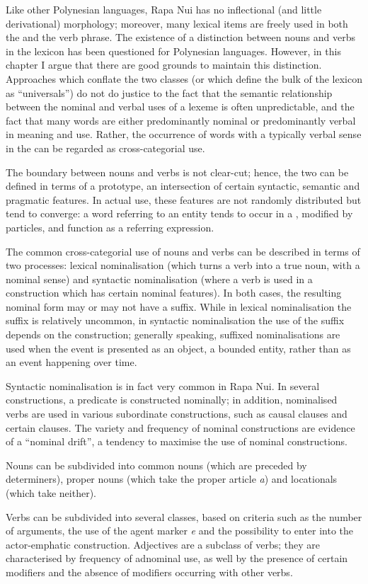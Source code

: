 Like other Polynesian languages, Rapa Nui has no inflectional (and little derivational) morphology; moreover, many lexical items are freely used in both the  and the verb phrase. The existence of a distinction between nouns and verbs in the lexicon has been questioned for Polynesian languages. However, in this chapter I argue that there are good grounds to maintain this distinction. Approaches which conflate the two classes (or which define the bulk of the lexicon as “universals”) do not do justice to the fact that the semantic relationship between the nominal and verbal uses of a lexeme is often unpredictable, and the fact that many words are either predominantly nominal or predominantly verbal in meaning and use. Rather, the occurrence of words with a typically verbal sense in the  can be regarded as cross-categorial use.

The boundary between nouns and verbs is not clear-cut; hence, the two can be defined in terms of a prototype, an intersection of certain syntactic, semantic and pragmatic features. In actual use, these features are not randomly distributed but tend to converge: a word referring to an entity tends to occur in a , modified by  particles, and function as a referring expression.

The common cross-categorial use of nouns and verbs can be described in terms of two processes: lexical nominalisation (which turns a verb into a true noun, with a nominal sense) and syntactic nominalisation (where a verb is used in a construction which has certain nominal features). In both cases, the resulting nominal form may or may not have a suffix. While in lexical nominalisation the suffix is relatively uncommon, in syntactic nominalisation the use of the suffix depends on the construction; generally speaking, suffixed nominalisations are used when the event is presented as an object, a bounded entity, rather than as an event happening over time.

Syntactic nominalisation is in fact very common in Rapa Nui. In several constructions, a  predicate is constructed nominally; in addition, nominalised verbs are used in various subordinate constructions, such as causal clauses and certain  clauses. The variety and frequency of nominal constructions are evidence of a “nominal drift”, a tendency to maximise the use of nominal constructions.

Nouns can be subdivided into common nouns (which are preceded by determiners), proper nouns (which take the proper article \textit{a}) and locationals (which take neither). 

Verbs can be subdivided into several classes, based on criteria such as the number of arguments, the use of the agent marker \textit{e} and the possibility to enter into the actor-emphatic construction. Adjectives are a subclass of verbs; they are characterised by frequency of adnominal use, as well by the presence of certain modifiers and the absence of modifiers occurring with other verbs.
